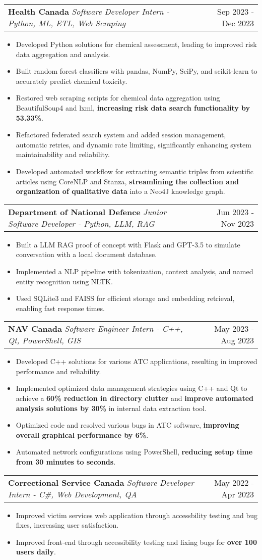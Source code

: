 \documentclass[letterpaper,11pt]{article}
\makeatletter
\newcommand{\resumeItem}[1]{
  \item\small{
    {#1 \vspace{-3pt}}
  }
}
\newcommand{\resumeSubheading}[3]{
    \item
    \begin{tabular*}{0.97\textwidth}[t]{l@{\extracolsep{\fill}}r}
      \textbf{#1} \textbar \textit{ #2} & #3 \\
    \end{tabular*}\vspace{-9pt}
}
\newcommand{\resumeItemListStart}{\begin{itemize}}
\newcommand{\resumeItemListEnd}{\end{itemize}\vspace{-5pt}}
\makeatother
\begin{document}
    \resumeSubheading
      {Health Canada}{Software Developer Intern - Python, ML, ETL, Web Scraping}{Sep 2023 - Dec 2023}
      \resumeItemListStart
        \resumeItem{Developed Python solutions for chemical assessment, leading to improved risk data aggregation and analysis.}
        \resumeItem{Built random forest classifiers with pandas, NumPy, SciPy, and scikit-learn to accurately predict chemical toxicity.}
        \resumeItem{Restored web scraping scripts for chemical data aggregation using BeautifulSoup4 and lxml, \textbf{increasing risk data search functionality by 53.33\%}.}
        \resumeItem{Refactored federated search system and added session management, automatic retries, and dynamic rate limiting, significantly enhancing system maintainability and reliability.}
        \resumeItem{Developed automated workflow for extracting semantic triples from scientific articles using CoreNLP and Stanza, \textbf{streamlining the collection and organization of qualitative data} into a Neo4J knowledge graph.}
      \resumeItemListEnd

    \resumeSubheading
    {Department of National Defence}{Junior Software Developer - Python, LLM, RAG}{Jun 2023 - Nov 2023}
      \resumeItemListStart
        \resumeItem{Built a LLM RAG proof of concept with Flask and GPT-3.5 to simulate conversation with a local document database.}
        \resumeItem{Implemented a NLP pipeline with tokenization, context analysis, and named entity recognition using NLTK.}
        \resumeItem{Used SQLite3 and FAISS for efficient storage and embedding retrieval, enabling fast response times.}
      \resumeItemListEnd

    \resumeSubheading
    {NAV Canada}{Software Engineer Intern - C++, Qt, PowerShell, GIS}{May 2023 - Aug 2023}
      \resumeItemListStart
        \resumeItem{Developed C++ solutions for various ATC applications, resulting in improved performance and reliability.}
        \resumeItem{Implemented optimized data management strategies using C++ and Qt to achieve a \textbf{60\% reduction in directory clutter} and \textbf{improve automated analysis solutions by 30\%} in internal data extraction tool.}
        \resumeItem{Optimized code and resolved various bugs in ATC software, \textbf{improving overall graphical performance by 6\%}.}
        \resumeItem{Automated network configurations using PowerShell, \textbf{reducing setup time from 30 minutes to seconds}.}
      \resumeItemListEnd

    \resumeSubheading
    {Correctional Service Canada}{Software Developer Intern - C\#, Web Development, QA}{May 2022 - Apr 2023}
      \resumeItemListStart
        \resumeItem{Improved victim services web application through accessbility testing and bug fixes, increasing user satisfaction.}
        \resumeItem{Improved front-end through accessibility testing and fixing bugs for \textbf{over 100 users daily}.}
      \resumeItemListEnd
\end{document}
